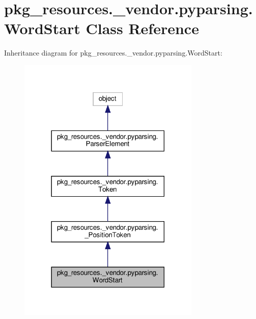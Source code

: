\hypertarget{classpkg__resources_1_1__vendor_1_1pyparsing_1_1WordStart}{}\section{pkg\+\_\+resources.\+\_\+vendor.\+pyparsing.\+Word\+Start Class Reference}
\label{classpkg__resources_1_1__vendor_1_1pyparsing_1_1WordStart}


Inheritance diagram for pkg\+\_\+resources.\+\_\+vendor.\+pyparsing.\+Word\+Start\+:
\nopagebreak
\begin{figure}[H]
\begin{center}
\leavevmode
\includegraphics[width=246pt]{classpkg__resources_1_1__vendor_1_1pyparsing_1_1WordStart__inherit__graph}
\end{center}
\end{figure}


